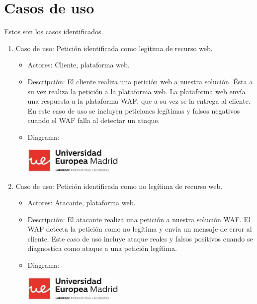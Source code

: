 \section{Casos de uso}
\par Estos son los casos identificados.
\begin{enumerate}
  \item Caso de uso: Petición identificada como legítima de recurso web.
    \begin{itemize}
      \item Actores: Cliente, plataforma web.
      \item Descripción: El cliente realiza una petición web a nuestra solución. Ésta a su vez realiza la petición a la plataforma web. La
        plataforma web envía una respuesta a la plataforma WAF, que a su vez se la entrega al cliente. En este caso de uso se incluyen peticiones
        legítimas y falsos negativos cuando el WAF falla al detectar un ataque.
      \item Diagrama:
        \begin{center}
          \label{fig:CasoUso1}
          \includegraphics[width=0.4\textwidth]{fig/CasoUso1}
        \end{center}
    \end{itemize}
  \item Caso de uso: Petición identificada como no legítima de recurso web.
    \begin{itemize}
      \item Actores: \Gls{Atacante}, plataforma web.
      \item Descripción: El atacante realiza una petición a nuestra solución WAF. El WAF detecta la petición como no legítima y envía un mensaje de
        error al cliente. Este caso de uso incluye ataque reales y falsos positivos cuando se diagnostica como ataque a una petición legítima.
      \item Diagrama:
        \begin{center}
          \label{fig:CasoUsoX}
          \includegraphics[width=0.4\textwidth]{fig/CasoUso1}
        \end{center}
    \end{itemize}

\end{enumerate}
